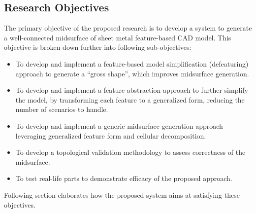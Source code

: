\subsection{Research Objectives} \label{sec:litsurvey:rquestions}

The primary objective of the proposed research is to develop a system to generate a well-connected midsurface of sheet metal feature-based CAD model. This objective is broken down further into following sub-objectives:
\begin{itemize}[noitemsep,topsep=2pt,parsep=2pt,partopsep=2pt]
\item To develop and implement a feature-based model simplification (defeaturing) approach to generate a ``gross shape'', which improves midsurface generation.
\item To develop and implement a feature abstraction approach to further simplify the model, by transforming each feature to a generalized form, reducing the number of scenarios to handle.
\item To develop and implement a generic midsurface generation approach leveraging generalized feature form and cellular decomposition.
\item To develop a topological validation methodology to assess correctness of the midsurface.
\item To test real-life parts to demonstrate efficacy of the proposed approach.
\end{itemize}

Following section elaborates how the proposed system aims at satisfying these objectives.


